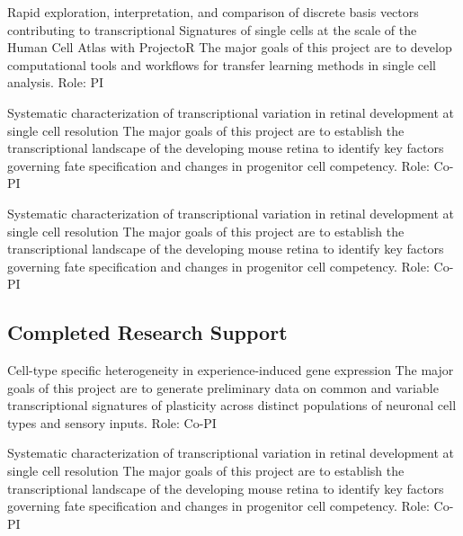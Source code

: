 \documentclass{nihbiosketch}
\begin{document}
\bigskip

{Rapid exploration, interpretation, and comparison of discrete basis vectors contributing to transcriptional Signatures of single cells at the scale of the Human Cell Atlas with ProjectoR}
{The major goals of this project are to develop computational tools and workflows for transfer learning methods in single cell analysis.}
{Role: PI}

{Systematic characterization of transcriptional variation in retinal development at single cell resolution}
{The major goals of this project are to establish the transcriptional landscape of the developing mouse retina to identify key factors governing fate specification and changes in progenitor cell competency.}
{Role: Co-PI}

\bigskip



{Systematic characterization of transcriptional variation in retinal development at single cell resolution}
{The major goals of this project are to establish the transcriptional landscape of the developing mouse retina to identify key factors governing fate specification and changes in progenitor cell competency.}
{Role: Co-PI}

\bigskip


\subsection*{Completed Research Support}

{Cell-type specific heterogeneity in experience-induced gene expression}
{The major goals of this project are to generate preliminary data on common and variable transcriptional signatures of plasticity across distinct populations of neuronal cell types and sensory inputs.}
{Role: Co-PI}

\bigskip

{Systematic characterization of transcriptional variation in retinal development at single cell resolution}
{The major goals of this project are to establish the transcriptional landscape of the developing mouse retina to identify key factors governing fate specification and changes in progenitor cell competency.}
{Role: Co-PI}

\bigskip
\end{document}
